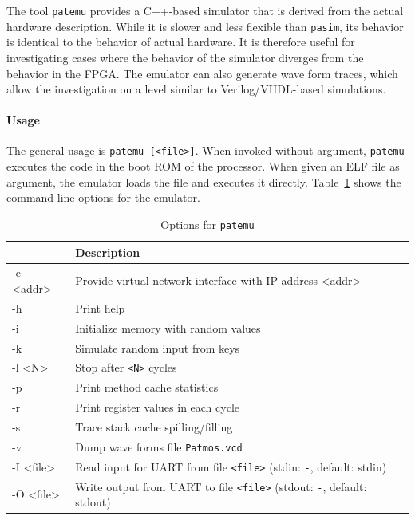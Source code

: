 \documentclass[a4paper,fontsize=10pt,twoside,DIV15,BCOR12mm,headinclude=true,footinclude=false,pagesize,bibtotoc]{scrbook}
\begin{document}
The tool \texttt{patemu} provides a C++-based simulator that
is derived from the actual hardware description. While it is slower
and less flexible than \texttt{pasim}, its behavior is identical to
the behavior of actual hardware. It is therefore useful for
investigating cases where the behavior of the simulator diverges from
the behavior in the FPGA. The emulator can also generate wave form
traces, which allow the investigation on a level similar to
Verilog/VHDL-based simulations.

\paragraph{Usage} 

The general usage is \texttt{patemu [<file>]}. When invoked
without argument, \texttt{patemu} executes the code in the
boot ROM of the processor. When given an ELF file as argument, the
emulator loads the file and executes it
directly. Table~\ref{tab:emulopts} shows the command-line options for
the emulator.

\begin{table}
  \centering
  \caption{Options for \texttt{patemu}}
  \label{tab:emulopts}
  \begin{tabular}{>{\ttfamily}l<{}p{}}
    \toprule
    \multicolumn{1}{l}{Option} & Description \\
    \midrule
    -e <addr>     & Provide virtual network interface with IP address <addr> \\
    -h            & Print help \\
    -i            & Initialize memory with random values \\
    -k            & Simulate random input from keys \\
    -l <N>        & Stop after \texttt{<N>} cycles \\
    -p            & Print method cache statistics \\
    -r            & Print register values in each cycle \\
    -s            & Trace stack cache spilling/filling \\
    -v            & Dump wave forms file \texttt{Patmos.vcd} \\
    -I <file>     & Read input for UART from file \texttt{<file>} (stdin: \texttt{-}, default: stdin) \\
    -O <file>     & Write output from UART to file \texttt{<file>} (stdout: \texttt{-}, default: stdout) \\
    \bottomrule
  \end{tabular}
\end{table}
\end{document}

